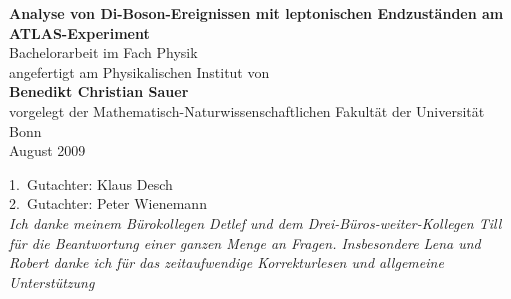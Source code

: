 \documentclass[a4paper,twoside]{scrartcl}
\author{Benedikt Christian Sauer}
\title{\mytitle}
\newcommand{\mytitle}{Analyse von Di-Boson-Ereignissen mit leptonischen
Endzuständen am ATLAS-Experiment}
\begin{document}
\begin{titlepage}
  \begin{center}
    \Huge{\bf\textsf{\mytitle}} \\
    \vspace{3cm}
    \Large Bachelorarbeit im Fach Physik \\
    \vspace{1cm}
    \normalsize angefertigt am Physikalischen Institut von \\
    \vspace{1cm}
    \large{\bf Benedikt Christian Sauer} \\
    \vspace{2cm}
    \normalsize vorgelegt der Mathematisch-Naturwissenschaftlichen Fakultät der Universität
    Bonn \\
    \vspace{1cm}
    \large August 2009
  \end{center}
\end{titlepage}
\newpage
\tableofcontents
\vfill
\begin{center}
  \large 1.\ Gutachter: Klaus Desch \\
  \large 2.\ Gutachter: Peter Wienemann \\
  \vspace{2cm}
  \textit{Ich danke meinem Bürokollegen Detlef und dem
  Drei-Büros-weiter-Kollegen Till für die Beantwortung einer ganzen Menge an
  Fragen. Insbesondere Lena und Robert danke ich für das zeitaufwendige
  Korrekturlesen und allgemeine Unterstützung}
\end{center}
\newpage




\end{document}
